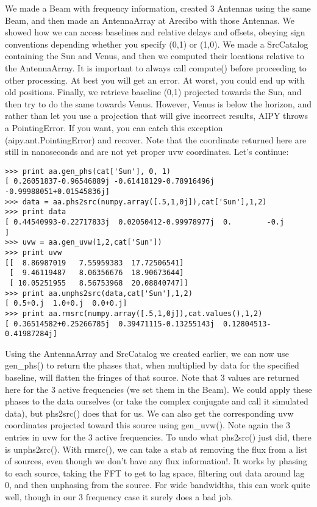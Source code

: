 We made a Beam with frequency information, created 3 Antennas using the
same Beam, and then made an AntennaArray at Arecibo with those Antennas.
We showed how we can access baselines and relative delays and offsets, 
obeying sign conventions depending whether you specify (0,1) or (1,0).  We
made a SrcCatalog containing the Sun and Venus, and then we computed their
locations relative to the AntennaArray. It is important to always call 
compute()
before proceeding to other processing.  At best you will get an error.  At
worst, you could end up with old positions.  Finally, we retrieve baseline
(0,1) projected towards the Sun, and then try to do the same towards Venus.
However, Venus is below the horizon, and rather than let you use a projection
that will give incorrect results, AIPY throws a PointingError.  If you want,
you can catch this exception (aipy.ant.PointingError) and recover.  Note
that the coordinate returned here are still in nanoseconds and are not
yet proper uvw coordinates.  Let's continue:

\begin{verbatim}
>>> print aa.gen_phs(cat['Sun'], 0, 1)
[ 0.26051837-0.96546889j -0.61418129-0.78916496j -0.99988051+0.01545836j]
>>> data = aa.phs2src(numpy.array([.5,1,0j]),cat['Sun'],1,2)
>>> print data
[ 0.44540993-0.22717833j  0.02050412-0.99978977j  0.        -0.j        ]
>>> uvw = aa.gen_uvw(1,2,cat['Sun'])
>>> print uvw
[[  8.86987019   7.55959383  17.72506541]
 [  9.46119487   8.06356676  18.90673644]
 [ 10.05251955   8.56753968  20.08840747]]
>>> print aa.unphs2src(data,cat['Sun'],1,2)
[ 0.5+0.j  1.0+0.j  0.0+0.j]
>>> print aa.rmsrc(numpy.array([.5,1,0j]),cat.values(),1,2)
[ 0.36514582+0.25266785j  0.39471115-0.13255143j  0.12804513-0.41987284j]
\end{verbatim}

Using the AntennaArray and SrcCatalog we created earlier, we can now
use gen\_phs() to return the phases that, when multiplied by data for the
specified baseline, will flatten the fringes of that source.  Note that
3 values are returned here for the 3 active frequencies (we set them
in the Beam).  We could apply these phases to the data ourselves (or
take the complex conjugate and call it simulated data), but 
phs2src() does that for us.  We can also get 
the corresponding uvw coordinates projected toward this source using 
gen\_uvw().  Note again
the 3 entries in uvw for the 3 active frequencies.  To undo what
phs2src() just did, there is unphs2src().  With rmsrc(), we can take a stab
at removing the flux from a list of sources, even though we don't have
any flux information!.  It works by phasing to each source,
taking the FFT to get to lag space, filtering out data around lag 0,
and then unphasing from the source.  For wide bandwidths, this can work
quite well, though in our 3 frequency case it surely does a bad job.

